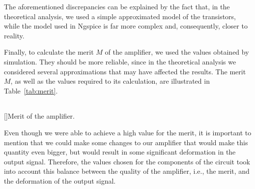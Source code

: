 The aforementioned discrepancies can be explained by the fact that, in the theoretical analysis, we used a simple approximated model of the transistors, while the model used in Ngspice is far more complex and, consequently, closer to reality.

Finally, to calculate the merit $M$ of the amplifier, we used the values obtained by simulation. They should be more reliable, since in the theoretical analysis we considered several approximations that may have affected the results. The merit $M$, as well as the values required to its calculation, are illustrated in Table~\ref{tab:merit}.

\vspace{2mm}

\begin{center}
\begin{tabular}{ | c | c | }\hline
 
\end{tabular}
[]{Merit of the amplifier.}
\label{tab:merit}
\end{center}

Even though we were able to achieve a high value for the merit, it is important to mention that we could make some changes to our amplifier that would make this quantity even bigger, but would result in some significant deformation in the output signal. Therefore, the values chosen for the components of the circuit took into account this balance between the quality of the amplifier, i.e., the merit, and the deformation of the output signal.
